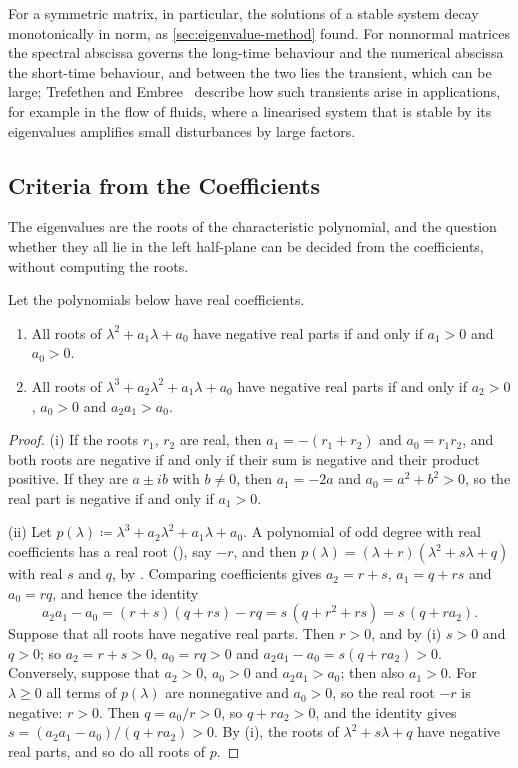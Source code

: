 For a symmetric matrix, in particular, the solutions of a stable system decay monotonically in norm, as \cref{sec:eigenvalue-method} found. For nonnormal matrices the spectral abscissa governs the long-time behaviour and the numerical abscissa the short-time behaviour, and between the two lies the transient, which can be large; Trefethen and Embree~\cite{trefethen2005} describe how such transients arise in applications, for example in the flow of fluids, where a linearised system that is stable by its eigenvalues amplifies small disturbances by large factors.

\subsection{Criteria from the Coefficients}

The eigenvalues are the roots of the characteristic polynomial, and the question whether they all lie in the left half-plane can be decided from the coefficients, without computing the roots.

\begin{theorem}
\label{thm:hurwitz-small}
Let the polynomials below have real coefficients.
\begin{enumerate}
\item All roots of $\lambda^2+a_1\lambda+a_0$ have negative real parts if and only if $a_1>0$ and $a_0>0$.
\item All roots of $\lambda^3+a_2\lambda^2+a_1\lambda+a_0$ have negative real parts if and only if $a_2>0$, $a_0>0$ and $a_2a_1>a_0$.
\end{enumerate}
\end{theorem}

\begin{proof}
(i) If the roots $r_1$, $r_2$ are real, then $a_1=-(r_1+r_2)$ and $a_0=r_1r_2$, and both roots are negative if and only if their sum is negative and their product positive. If they are $a\pm ib$ with $b\ne0$, then $a_1=-2a$ and $a_0=a^2+b^2>0$, so the real part is negative if and only if $a_1>0$.

(ii) Let $p(\lambda)\coloneqq\lambda^3+a_2\lambda^2+a_1\lambda+a_0$. A polynomial of odd degree with real coefficients has a real root (), say $-r$, and then $p(\lambda)=(\lambda+r)(\lambda^2+s\lambda+q)$ with real $s$ and $q$, by . Comparing coefficients gives $a_2=r+s$, $a_1=q+rs$ and $a_0=rq$, and hence the identity
\[
a_2a_1-a_0=(r+s)(q+rs)-rq=s\,(q+r^2+rs)=s\,(q+ra_2).
\]
Suppose that all roots have negative real parts. Then $r>0$, and by (i) $s>0$ and $q>0$; so $a_2=r+s>0$, $a_0=rq>0$ and $a_2a_1-a_0=s(q+ra_2)>0$. Conversely, suppose that $a_2>0$, $a_0>0$ and $a_2a_1>a_0$; then also $a_1>0$. For $\lambda\ge0$ all terms of $p(\lambda)$ are nonnegative and $a_0>0$, so the real root $-r$ is negative: $r>0$. Then $q=a_0/r>0$, so $q+ra_2>0$, and the identity gives $s=(a_2a_1-a_0)/(q+ra_2)>0$. By (i), the roots of $\lambda^2+s\lambda+q$ have negative real parts, and so do all roots of $p$.
\end{proof}

